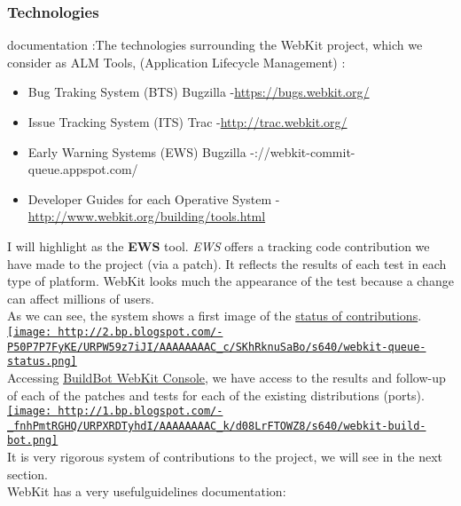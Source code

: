 \subsubsection{ Technologies} documentation :The technologies surrounding the WebKit project, which we consider as ALM Tools, (Application Lifecycle Management) :
\begin{itemize}
	\item Bug Traking System (BTS) Bugzilla -\nolinebreak\href{https://bugs.webkit.org/}{https://bugs.webkit.org/}
	\item Issue Tracking System (ITS) Trac -\nolinebreak\href{http://trac.webkit.org/}{http://trac.webkit.org/}
	\item Early Warning Systems (EWS) Bugzilla -\nolinebreakhttp://webkit-commit-queue.appspot.com/
	\item Developer Guides for each Operative System -\nolinebreak\href{http://www.webkit.org/building/tools.html}{http://www.webkit.org/building/tools.html}
\end{itemize} I will highlight as the \textbf{EWS} tool. \textit{EWS} offers a tracking code contribution we have made to the project (via a patch). It reflects the results of each test in each type of platform. WebKit looks much the appearance of the test because a change can affect millions of users.
\\ As we can see, the system shows a first image of the \href{http://webkit-commit-queue.appspot.com/}{status of contributions}.
\\\href{http://2.bp.blogspot.com/-P50P7P7FyKE/URPW59z7iJI/AAAAAAAAC_c/SKhRknuSaBo/s1600/webkit-queue-status.png}{
\texttt{[image: http://2.bp.blogspot.com/-P50P7P7FyKE/URPW59z7iJI/AAAAAAAAC\_c/SKhRknuSaBo/s640/webkit-queue-status.png]}}
\\ Accessing \href{http://build.webkit.org/console}{BuildBot WebKit Console}, we have access to the results and follow-up of each of the patches and tests for each of the existing distributions (ports).
\\\href{http://1.bp.blogspot.com/-_fnhPmtRGHQ/URPXRDTyhdI/AAAAAAAAC_k/d08LrFTOWZ8/s1600/webkit-build-bot.png}{
\texttt{[image: http://1.bp.blogspot.com/-\_fnhPmtRGHQ/URPXRDTyhdI/AAAAAAAAC\_k/d08LrFTOWZ8/s640/webkit-build-bot.png]}}
\\ It is very rigorous system of contributions to the project, we will see in the next section.
\\ WebKit has a very useful\nolinebreak\nolinebreakdevelopment guidelines documentation:

